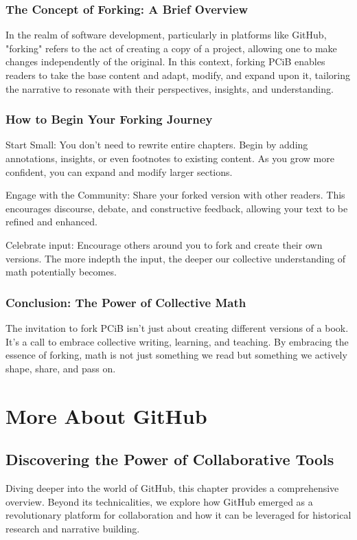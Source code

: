 \documentclass[a4paper,12pt]{book}
\begin{document}
\subsection*{The Concept of Forking: A Brief Overview}

In the realm of software development, particularly in platforms like GitHub, "forking" refers to the act of creating a copy of a project, allowing one to make changes independently of the original. In this context, forking PCiB enables readers to take the base content and adapt, modify, and expand upon it, tailoring the narrative to resonate with their perspectives, insights, and understanding.

\subsection*{How to Begin Your Forking Journey}

Start Small: You don't need to rewrite entire chapters. Begin by adding annotations, insights, or even footnotes to existing content. As you grow more confident, you can expand and modify larger sections.

Engage with the Community: Share your forked version with other readers. This encourages discourse, debate, and constructive feedback, allowing your text to be refined and enhanced.

Celebrate input: Encourage others around you to fork and create their own versions. The more indepth the input, the deeper our collective understanding of math potentially becomes.

\subsection*{Conclusion: The Power of Collective Math}

The invitation to fork PCiB isn't just about creating different versions of a book. It's a call to embrace collective writing, learning, and teaching. By embracing the essence of forking, math is not just something we read but something we actively shape, share, and pass on.

\chapter{More About GitHub}
\section*{Discovering the Power of Collaborative Tools}
Diving deeper into the world of GitHub, this chapter provides a comprehensive overview. Beyond its technicalities, we explore how GitHub emerged as a revolutionary platform for collaboration and how it can be leveraged for historical research and narrative building.
\end{document}
